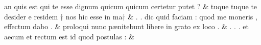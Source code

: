\documentclass[12pt,onecolumn,twoside,a4paper]{memoir}
\begin{document}
\begin{pairs}
\begin{Leftside}
                              an
                              quis
                              est
                              qui
                              te
                              esse
                              dignum
                              quicum
                              {quicum}
                              certetur
                              putet
                              ? \&
                         \stanza {}
                     tuque
                              {tuque}
                              te
                              desider
                              e
                              residem
                              †
                              nos
                              hic
                              esse
                              in
                              ma† \&
                         \stanza {}
                     .
                              .
                              dic
                              quid
                              faciam
                              :
                              quod
                              me
                              moneris
                              ,
                              effectum
                              dabo
                              . \&
                         \stanza {}
                     proloqui
                              nunc
                              pænitebunt
                              libere
                              in
                              grato
                              ex
                              loco
                              . \&
                         \stanza {}.
                              .
                              .
                              et
                              aecum
                              et
                              rectum
                              est
                              id
                              quod
                              postulas
                              : & 
                     

\end{Leftside}
\end{pairs}
\end{document}
